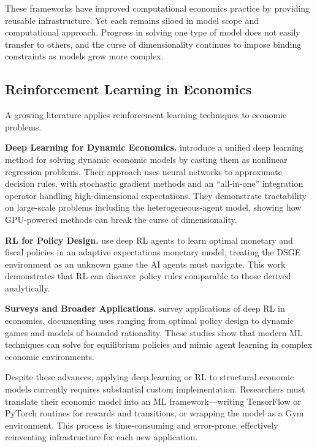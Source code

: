 \documentclass[12pt]{article}
\begin{document}
These frameworks have improved computational economics practice by providing reusable infrastructure. Yet each remains siloed in model scope and computational approach. Progress in solving one type of model does not easily transfer to others, and the curse of dimensionality continues to impose binding constraints as models grow more complex.

\subsection{Reinforcement Learning in Economics}

A growing literature applies reinforcement learning techniques to economic problems.

\textbf{Deep Learning for Dynamic Economics.} \citet{maliar2021deep} introduce a unified deep learning method for solving dynamic economic models by casting them as nonlinear regression problems. Their approach uses neural networks to approximate decision rules, with stochastic gradient methods and an ``all-in-one'' integration operator handling high-dimensional expectations. They demonstrate tractability on large-scale problems including the \citet{krusell1998income} heterogeneous-agent model, showing how GPU-powered methods can break the curse of dimensionality.

\textbf{RL for Policy Design.} \citet{chen2021deep} use deep RL agents to learn optimal monetary and fiscal policies in an adaptive expectations monetary model, treating the DSGE environment as an unknown game the AI agents must navigate. This work demonstrates that RL can discover policy rules comparable to those derived analytically.

\textbf{Surveys and Broader Applications.} \citet{atashbar2022ai} survey applications of deep RL in economics, documenting uses ranging from optimal policy design to dynamic games and models of bounded rationality. These studies show that modern ML techniques can solve for equilibrium policies and mimic agent learning in complex economic environments.

Despite these advances, applying deep learning or RL to structural economic models currently requires substantial custom implementation. Researchers must translate their economic model into an ML framework---writing TensorFlow or PyTorch routines for rewards and transitions, or wrapping the model as a Gym environment. This process is time-consuming and error-prone, effectively reinventing infrastructure for each new application.
\end{document}
